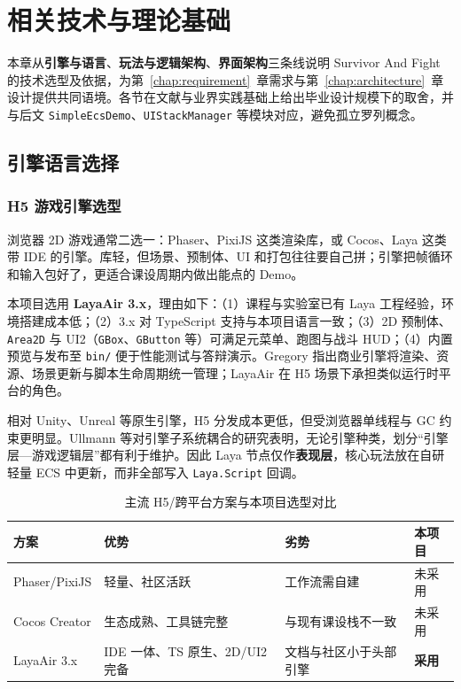 \chapter{相关技术与理论基础}
\label{chap:related}

本章从\textbf{引擎与语言}、\textbf{玩法与逻辑架构}、\textbf{界面架构}三条线说明 Survivor And Fight 的技术选型及依据，为第~\ref{chap:requirement}~章需求与第~\ref{chap:architecture}~章设计提供共同语境。各节在文献与业界实践基础上给出毕业设计规模下的取舍，并与后文 \texttt{SimpleEcsDemo}、\texttt{UIStackManager} 等模块对应，避免孤立罗列概念。

\section{引擎语言选择}
\label{sec:engine-lang}

\subsection{H5 游戏引擎选型}

浏览器 2D 游戏通常二选一：Phaser、PixiJS 这类渲染库，或 Cocos、Laya 这类带 IDE 的引擎。库轻，但场景、预制体、UI 和打包往往要自己拼；引擎把帧循环和输入包好了，更适合课设周期内做出能点的 Demo\cite{goslin2004panda,gregory2018game}。

本项目选用 \textbf{LayaAir 3.x}，理由如下：（1）课程与实验室已有 Laya 工程经验，环境搭建成本低；（2）3.x 对 TypeScript 支持与本项目语言一致；（3）2D 预制体、\texttt{Area2D} 与 UI2（\texttt{GBox}、\texttt{GButton} 等）可满足元菜单、跑图与战斗 HUD；（4）内置预览与发布至 \texttt{bin/} 便于性能测试与答辩演示。Gregory 指出商业引擎将渲染、资源、场景更新与脚本生命周期统一管理\cite{gregory2018game}；LayaAir 在 H5 场景下承担类似运行时平台的角色。

相对 Unity、Unreal 等原生引擎，H5 分发成本更低，但受浏览器单线程与 GC 约束更明显。Ullmann 等对引擎子系统耦合的研究表明，无论引擎种类，划分“引擎层—游戏逻辑层”都有利于维护\cite{ullmann2023coupling}。因此 Laya 节点仅作\textbf{表现层}，核心玩法放在自研轻量 ECS 中更新，而非全部写入 \texttt{Laya.Script} 回调。

\begin{table}[htbp]
  \centering
  \caption{主流 H5/跨平台方案与本项目选型对比}
  \label{tab:engine-compare}
  \begin{tabular}{p{2.8cm}p{4.2cm}p{4.2cm}p{2.8cm}}
    \toprule
    \textbf{方案} & \textbf{优势} & \textbf{劣势} & \textbf{本项目} \\
    \midrule
    Phaser/PixiJS & 轻量、社区活跃 & 工作流需自建 & 未采用 \\
    Cocos Creator & 生态成熟、工具链完整 & 与现有课设栈不一致 & 未采用 \\
    LayaAir 3.x & IDE 一体、TS 原生、2D/UI2 完备 & 文档与社区小于头部引擎 & \textbf{采用} \\
    \bottomrule
  \end{tabular}
\end{table}

